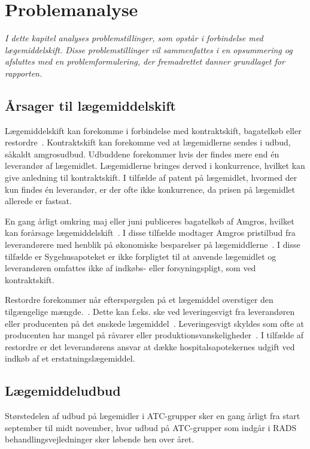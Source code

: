 \chapter{Problemanalyse}
\textit{I dette kapitel analyses problemstillinger, som opstår i forbindelse med lægemiddelskift. Disse problemstillinger vil sammenfattes i en opsummering og afsluttes med en problemformulering, der fremadrettet danner  grundlaget for rapporten.}

\section{Årsager til lægemiddelskift}
Lægemiddelskift kan forekomme i forbindelse med kontraktskift, bagatelkøb eller restordre~\citep{Amgros2015}. Kontraktskift kan forekomme ved at lægemidlerne sendes i udbud, såkaldt amgrosudbud. Udbuddene forekommer hvis der findes mere end én leverandør af lægemidlet. Lægemidlerne bringes derved i konkurrence, hvilket kan give anledning til kontraktskift. I tilfælde af patent på lægemidlet, hvormed der kun findes én leverandør, er der ofte ikke konkurrence, da prisen på lægemidlet allerede er fastsat.~\citep{Amgros2015} 

En gang årligt omkring maj eller juni publiceres bagatelkøb af Amgros, hvilket kan forårsage lægemiddelskift~\citep{Amgros2018}. I disse tilfælde modtager Amgros pristilbud fra leverandørere med henblik på økonomiske besparelser på lægemiddlerne~\citep{Amgros2012}. I disse tilfælde er Sygehusapoteket er ikke forpligtet til at anvende lægemidlet og leverandøren omfattes ikke af indkøbs- eller forsyningspligt, som ved kontraktskift.~\citep{Amgros2018}

Restordre forekommer når efterspørgslen på et lægemiddel overstiger den tilgængelige mængde.~\citep{Amgros2015}. Dette kan f.eks. ske ved leveringesvigt fra leverandøren eller producenten på det ønskede lægemiddel~\citep{Amgros2017, Laegemiddelinformaion2017}. Leveringesvigt skyldes som ofte at producenten har mangel på råvarer eller produktionsvanskeligheder~\citep{Amgros2017, Laegemiddelinformaion2017}. I tilfælde  af restordre er det leverandørens ansvar at dække hospitalsapotekernes udgift ved indkøb af et erstatningslægemiddel.

\section{Lægemiddeludbud}
Størstedelen af udbud på lægemidler i ATC-grupper sker en gang årligt fra start september til midt november, hvor udbud på ATC-grupper som indgår i RADS behandlingsvejledninger  sker løbende hen over året.~\citep{Sygehusapoteket2017}

